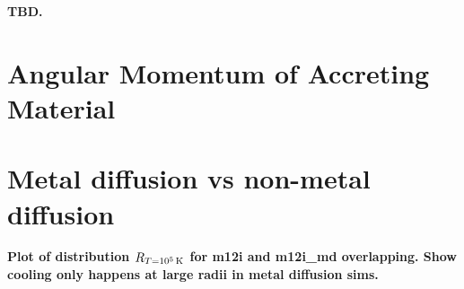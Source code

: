 \documentclass[fleqn,usenatbib]{mnras}
\newcommand{\Rcool}{R_{T=10^5\,{\rm K}}}
\begin{document}
\textbf{TBD.}










\appendix

\section{Angular Momentum of Accreting Material}


\section{Metal diffusion vs non-metal diffusion}

\textbf{Plot of distribution $\Rcool$ for m12i and m12i\_md overlapping. Show cooling only happens at large radii in metal diffusion sims.}



\bsp	%
\label{lastpage}
\end{document}
